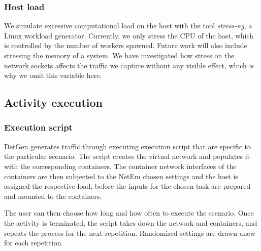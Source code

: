\documentclass[sigconf]{acmart}
\begin{document}

\subsubsection{Host load}

We simulate excessive computational load on the host with the tool \emph{stress-ng}, a Linux workload generator. Currently, we only stress the CPU of the host, which is controlled by the number of workers spawned. Future work will also include stressing the memory of a system. We have investigated how stress on the network sockets affects the traffic we capture without any visible effect, which is why we omit this variable here.   

\subsection{Activity execution}

\subsubsection*{Execution script}

DetGen generates traffic through executing execution script that are specific to the particular scenario. The script creates the virtual network and populates it with the corresponding containers. The container network interfaces of the containers are then subjected to the NetEm chosen settings and the host is assigned the respective load, before the inputs for the chosen task are prepared and mounted to the containers. 

The user can then choose how long and how often to execute the scenario. Once the activity is terminated, the script takes down the network and containers, and repeats the process for the next repetition. Randomised settings are drawn anew for each repetition.
\end{document}
